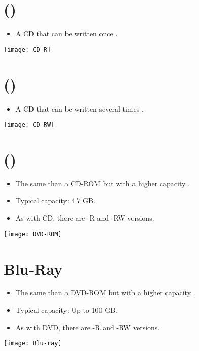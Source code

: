 \section{ ({)}}
\begin{itemize}
\item A \gls{CD} that can be written once \cite{wikipedia_CD-R}.
\end{itemize}
\vspace{-4ex}
\begin{center}
  \texttt{[image: CD-R]}
\end{center}

\section{ ({)}}
\begin{itemize}
\item A \gls{CD} that can be written several times \cite{wikipedia_CD-RW}.
\end{itemize}
\vspace{-4ex}
\begin{center}
  \texttt{[image: CD-RW]}
\end{center}

\section{ ({)}}
\begin{itemize}
\item The same than a \gls{CD-ROM} but with a higher capacity
  \cite{wikipedia_DVD}.
\item Typical capacity: 4.7 GB.
\item As with \gls{CD}, there are -R and -RW versions.
\end{itemize}
\vspace{-4ex}
\begin{center}
  \texttt{[image: DVD-ROM]}
\end{center}

\section{Blu-Ray}
\begin{itemize}
\item The same than a \gls{DVD-ROM} but with a higher capacity
  \cite{BR}.
\item Typical capacity: Up to 100 GB.
\item As with \gls{DVD}, there are -R and -RW versions.
\end{itemize}
\vspace{-4ex}
\begin{center}
  \texttt{[image: Blu-ray]}
\end{center}

